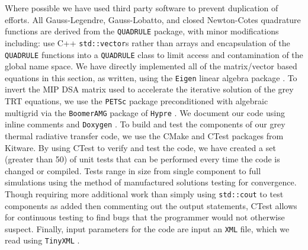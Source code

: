 Where possible we have used third party software to prevent duplication of  efforts.
All Gauss-Legendre, Gauss-Lobatto, and closed Newton-Cotes quadrature functions are derived from the \verb+QUADRULE+ \cite{quadrule} package, with minor modifications including: use C++ \verb+std::vector+s rather than arrays and encapsulation of the \verb+QUADRULE+ functions into a \verb+QUADRULE+ class to limit access and contamination of the global name space.
We have directly implemented all of the matrix/vector based equations in this section, as written, using the \verb+Eigen+ linear algebra package \cite{eigen}.
To invert the MIP DSA matrix used to accelerate the iterative solution of the grey TRT equations, we use the \verb+PETSc+ package\cite{petsc} preconditioned with algebraic multigrid\cite{mip_mc} via the \verb+BoomerAMG+ package of \verb+Hypre+ \cite{hypre}.
We document our code using  inline comments  and \verb+Doxygen+ \cite{doxygen}.
To build and test the components of our grey thermal radiative transfer code, we use the CMake and CTest packages from Kitware\cite{cmake}.
By using CTest to verify and test the code, we have created a set (greater than 50) of unit tests that can be performed every time the code is changed or compiled.
Tests range in size from single component to full simulations using the method of manufactured solutions\cite{mms} testing for convergence.
Though requiring more additional work than simply using \verb+std::cout+ to test components as added then commenting out the output statements, CTest allows for continuous testing to find bugs that the programmer would not otherwise suspect.
Finally, input parameters for the code are input an \verb+XML+ file, which we read using \verb+TinyXML+ \cite{xml}. 
